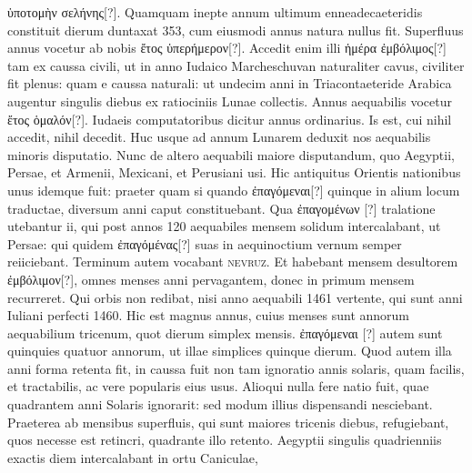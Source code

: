  \textgreek{ὑποτομὴν σελήνης[?]}.
Quamquam inepte annum ultimum enneadecaeteridis constituit dierum
duntaxat 353, cum eiusmodi annus natura nullus fit.
Superfluus
annus vocetur ab nobis \textgreek{ἔτος ὑπερήμερον[?]}.
Accedit enim illi \textgreek{ἡμέρα ἐμβόλιμος[?]}
tam ex caussa civili, ut in anno Iudaico Marcheschuvan naturaliter
cavus, civiliter fit plenus: quam e caussa naturali: ut undecim anni
in Triacontaeteride Arabica augentur singulis diebus ex ratiociniis
Lunae collectis.
Annus aequabilis vocetur \textgreek{ἔτος ὁμαλόν[?]}.
Iudaeis computatoribus
dicitur annus ordinarius.
Is est, cui nihil accedit, nihil decedit.
Huc usque ad annum Lunarem deduxit nos aequabilis minoris
disputatio.
Nunc de altero aequabili maiore disputandum, quo Aegyptii,
Persae, et Armenii, Mexicani, et Perusiani usi.
Hic antiquitus
Orientis nationibus unus idemque fuit: praeter quam si quando
 \textgreek{ἐπαγόμεναι[?]}
quinque in alium locum traductae, diversum anni caput constituebant.
Qua \textgreek{ἐπαγομένων [?]} tralatione utebantur ii,
 qui post annos 120
aequabiles mensem solidum intercalabant, ut Persae: qui quidem
 \textgreek{ἐπαγόμένας[?]}
suas in aequinoctium vernum semper reiiciebant.
Terminum autem vocabant \textsc{nevruz}.
%
Et habebant mensem desultorem
\textgreek{ἐμβόλιμον[?]}, omnes menses anni pervagantem, donec in primum
mensem recurreret.
Qui orbis non redibat, nisi anno aequabili 1461
vertente, qui sunt anni Iuliani perfecti 1460.
Hic est magnus annus,
cuius menses sunt annorum aequabilium tricenum, quot dierum simplex
mensis.
\textgreek{ἐπαγόμεναι [?]} autem sunt quinquies quatuor annorum, ut
illae simplices quinque dierum.
Quod autem illa anni forma retenta
fit, in caussa fuit non tam ignoratio annis solaris,
 quam facilis, et tractabilis,
ac vere popularis eius usus.
Alioqui nulla fere natio fuit, quae
quadrantem anni Solaris ignorarit: sed modum illius dispensandi
nesciebant.
Praeterea ab mensibus superfluis, qui sunt maiores tricenis
diebus, refugiebant, quos necesse est retincri,
 quadrante illo retento.
Aegyptii singulis quadrienniis exactis diem intercalabant
 in ortu Caniculae,
